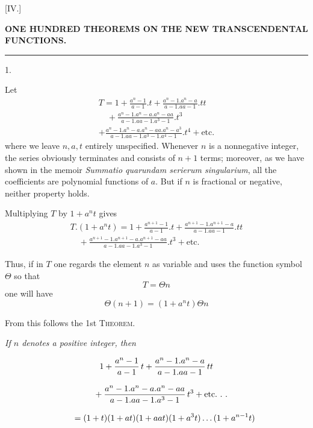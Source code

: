 \begingroup
\renewcommand{\arraystretch}{1.45}
\clearpage{}


\begin{center}
[IV.]\par
\bigskip
\textbf{ONE HUNDRED THEOREMS ON THE NEW TRANSCENDENTAL FUNCTIONS.}\par
\medskip
\rule{.09\textwidth}{.3pt}\par
\bigskip
{}1.
\end{center}

Let
\[
\begin{gathered}
T={}1+\frac{a^n-1}{a-1}.t
+\frac{a^n-1.a^n-a}{a-1.aa-1}.tt
\\[8pt]\quad{}+\frac{a^n-1.a^n-a.a^n-aa}{a-1.aa-1.a^3-1}.t^3\\[8pt]
+\frac{a^n-1.a^n-a.a^n-aa.a^n-a^3}
{a-1.aa-1.a^3-1.a^4-1}.t^4+\text{etc.}
\end{gathered}
\]
where we leave $n,a,t$ entirely unspecified. Whenever $n$ is a nonnegative
integer, the series obviously terminates and consists of $n+1$ terms; moreover,
as we have shown in the memoir \textit{Summatio quarundam serierum singularium}, all the coefficients are polynomial functions of $a$. But if $n$ is fractional or negative, neither property holds.


Multiplying $T$ by $1+a^n t$ gives
\[
\begin{gathered}T.(1+a^n t)=1+\frac{a^{n+1}-1}{a-1}.t
+\frac{a^{n+1}-1.a^{n+1}-a}{a-1.aa-1}.tt
\\[8pt]\quad{}+\frac{a^{n+1}-1.a^{n+1}-a.a^{n+1}-aa}{a-1.aa-1.a^3-1}.t^3
+\text{etc.}\end{gathered}
\]


Thus, if in $T$ one regards the element $n$ as variable and uses
the function symbol $\Theta$ so that
\[
T=\Theta n
\]
one will have
\[
\Theta(n+1)=(1+a^n t)\Theta n
\]

From this follows the 1st \textsc{Theorem.}




\begin{center}
\textit{If $n$ denotes a positive integer, then}
\end{center}
\[
\begin{gathered}
1+\frac{a^n-1}{a-1}\,t
 +\frac{a^n-1.a^n-a}{a-1.aa-1}\,tt
 \\[8pt]\quad{}+\frac{a^n-1.a^n-a.a^n-aa}{a-1.aa-1.a^3-1}\,t^3
 +\text{etc.}\ .\ .
\\[8pt]
\qquad=(1+t)(1+at)(1+aat)(1+a^3t)\mathinner{.\,.\,.}(1+a^{n-1}t)
\end{gathered}
\]

\clearpage
\endgroup
